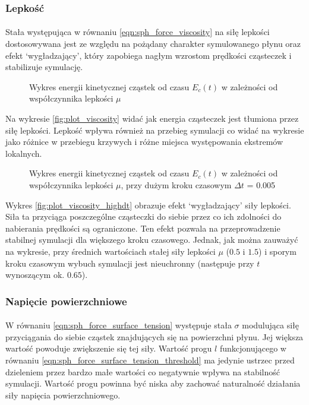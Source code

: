 \subsubsection{Lepkość}

\paragraph{}
Stała występująca w równaniu \eqref{eqn:sph_force_viscosity} na siłę lepkości dostosowywana jest ze względu na pożądany charakter symulowanego płynu oraz efekt `wygładzający', który zapobiega nagłym wzrostom prędkości cząsteczek i stabilizuje symulację.
\par

\begin{figure}[H]

\caption{Wykres energii kinetycznej cząstek od czasu $E_c(t)$ w zależności od współczynnika lepkości $\mu$}
\label{fig:plot_viscosity}
\end{figure}

\par
Na wykresie \eqref{fig:plot_viscosity} widać jak energia cząsteczek jest tłumiona przez siłę lepkości. Lepkość wpływa również na przebieg symulacji co widać na wykresie jako różnice w przebiegu krzywych i różne miejsca występowania ekstremów lokalnych.
\par

\begin{figure}[H]

\caption{Wykres energii kinetycznej cząstek od czasu $E_c(t)$ w zależności od współczynnika lepkości $\mu$, przy dużym kroku czasowym $\Delta t$ = 0.005}
\label{fig:plot_viscosity_highdt}
\end{figure}

\par
Wykres \eqref{fig:plot_viscosity_highdt} obrazuje efekt `wygładzający' siły lepkości. Siła ta przyciąga poszczególne cząsteczki do siebie przez co ich zdolności do nabierania prędkości są ograniczone. Ten efekt pozwala na przeprowadzenie stabilnej symulacji dla większego kroku czasowego. Jednak, jak można zauważyć na wykresie, przy średnich wartościach stałej siły lepkości $\mu$ ($0.5$ i $1.5$) i sporym kroku czasowym wybuch symulacji jest nieuchronny (następuje przy $t$ wynoszącym ok. $0.65$).

\subsubsection{Napięcie powierzchniowe}

\paragraph{}
W równaniu \eqref{eqn:sph_force_surface_tension} występuje stała $\sigma$ modulująca siłę przyciągania do siebie cząstek znajdujących się na powierzchni płynu. Jej większa wartość powoduje zwiększenie się tej siły.
Wartość progu $l$ funkcjonującego w równaniu \eqref{eqn:sph_force_surface_tension_threshold} ma jedynie ustrzec przed dzieleniem przez bardzo małe wartości co negatywnie wpływa na stabilność symulacji. Wartość progu powinna być niska aby zachować naturalność działania siły napięcia powierzchniowego.
\par